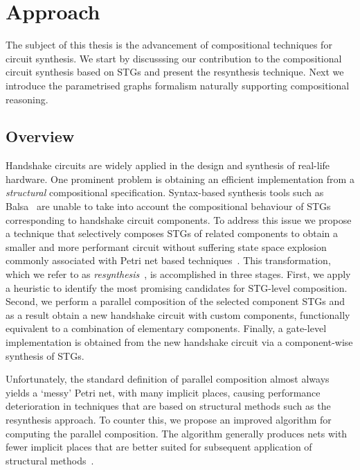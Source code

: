 \chapter{Approach\label{chap:Approach}}

The subject of this thesis is the advancement of compositional techniques for circuit synthesis. We start by discusssing our contribution to the compositional circuit synthesis based on STGs and present the resynthesis technique. Next we introduce the parametrised graphs formalism naturally supporting compositional reasoning. 


\section{Overview}
Handshake circuits are widely applied in the design and synthesis of real-life hardware.
One prominent problem is obtaining an efficient implementation from a \emph{structural} compositional specification.
Syntax-based synthesis tools such as Balsa~\cite{balsa} are unable to take into account the compositional
behaviour of STGs corresponding to handshake circuit components. To address this issue we propose 
a technique that selectively composes STGs of related components to obtain a smaller and more performant
circuit without suffering state space explosion commonly associated with Petri net based techniques~\cite{Valmari}.
This transformation, which we refer to as \emph{resynthesis}~\cite{ukaf_balsa_resynthesis}, is accomplished in three stages. First, we apply a heuristic to identify the most promising candidates for STG-level composition. Second, we perform a parallel composition of the selected component STGs and as a result obtain a new handshake circuit with custom components, functionally equivalent to a combination of elementary components. Finally, a gate-level implementation is obtained from the new handshake circuit via a component-wise synthesis of STGs.

Unfortunately, the standard definition of parallel composition almost always yields a `messy' Petri net, with many implicit places, causing performance deterioration in techniques that are based on structural methods such as the resynthesis approach. To counter this, we propose an improved algorithm for computing the parallel composition. The algorithm generally produces nets with fewer implicit places that are better suited for subsequent application of structural methods~\cite{improved_par_comp}.

